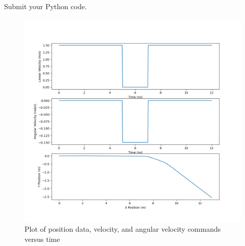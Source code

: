 \documentclass{article}
\begin{document}
\bigskip
\noindent Submit your Python code.

\begin{figure}[H]
  \centering
  \includegraphics[width=\textwidth]{question3.png}
  \caption*{Plot of position data, velocity, and angular velocity commands versus time}
\end{figure}
\end{document}
